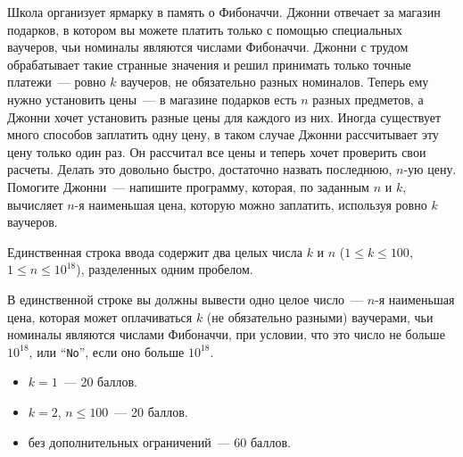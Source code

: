 
Школа организует ярмарку в память о Фибоначчи. Джонни отвечает за магазин подарков, в котором вы можете
платить только с помощью специальных ваучеров, чьи номиналы являются числами Фибоначчи. Джонни с трудом обрабатывает
такие странные значения и решил принимать только точные платежи~--- ровно $k$ ваучеров, не обязательно
разных номиналов. Теперь ему нужно установить цены~--- в магазине подарков есть $n$ разных предметов, а Джонни хочет
установить разные цены для каждого из них. Иногда существует много способов заплатить одну цену, в таком случае Джонни
рассчитывает эту цену только один раз. Он рассчитал все цены и теперь хочет проверить свои расчеты. Делать это довольно
быстро, достаточно назвать последнюю, $n$-ую цену. Помогите Джонни~--- напишите программу, которая, по заданным $n$ и $k$,
вычисляет $n$-я наименьшая цена, которую можно заплатить, используя ровно $k$ ваучеров.

\Input
Единственная строка ввода содержит два целых числа $k$ и $n$ ($1 \le k \le 100$, $1 \le n \le 10^{18}$), разделенных одним пробелом.

\Output
В единственной строке вы должны вывести одно целое число~--- $n$-я наименьшая цена, которая может
оплачиваться $k$ (не обязательно разными) ваучерами, чьи номиналы являются числами Фибоначчи, при условии, что это
число не больше $10^{18}$, или ``\texttt{No}'', если оно больше $10^{18}$.

\Samples
\BeginTests
\EndTests

\Scoring
\begin{itemize}
	\item $k = 1$~--- 20 баллов.
	\item $k = 2$, $n \le 100$~--- 20 баллов.
	\item без дополнительных ограничений~--- 60 баллов.
\end{itemize}

\EndProblem
